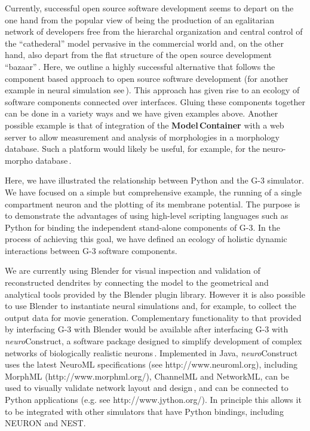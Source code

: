 \documentclass[12pt]{article}
\begin{document}
Currently, successful open source software development 
seems to depart on the one hand from the popular view of being the
production of an egalitarian network of developers free from the
hierarchal organization and central control of the ``cathederal''
model pervasive in the commercial world and, on the other hand, also
depart from the flat structure of the open source development
``bazaar''\,\cite{raymond01:_cathed_bazaar}\cite{Open-Source03theecology}.
Here, we outline a highly successful alternative that follows the
component based approach to open source software development (for
another example in neural simulation
see\,\cite{schuermann09:_neuron}). This approach has given rise to an
ecology of software components connected over interfaces.  Gluing
these components together can be done in a variety ways and we have
given examples above. Another possible example is that of integration
of the {\bf Model\,Container} with a web server to allow measurement
and analysis of morphologies in a morphology database.  Such a
platform would likely be useful, for example, for the neuro-morpho
database\,\cite{ascoli06:_mobil, ascoli07:_neurom}.

Here, we have illustrated the relationship between Python and the G-3
simulator.  We have focused on a simple but comprehensive example, the
running of a single compartment neuron and the plotting of its
membrane potential. The purpose is to demonstrate the advantages of
using high-level scripting languages such as Python for binding the
independent stand-alone components of G-3. In the process of achieving this goal, we have defined an ecology of holistic dynamic interactions between G-3 software components.


We are currently using Blender for visual inspection and validation of
reconstructed dendrites by connecting the model to the geometrical and
analytical tools provided by the Blender plugin library.  However it
is also possible to use Blender to instantiate neural simulations
and, for example, to collect the output data for movie generation.
Complementary functionality to that provided by interfacing G-3 with
Blender would be available after interfacing G-3 with {\it
  neuro}Construct, a software package designed to simplify development
of complex networks of biologically realistic
neurons\,\cite{gleeson05:_build_networ_model, gleeson07}.  Implemented in Java, {\it neuro}Construct uses the latest NeuroML specifications (see
http://www.neuroml.org), including MorphML (http://www.morphml.org/),
ChannelML and NetworkML, can be used to visually validate network
layout and design\,\cite{crook07:_morph}, and can be connected to Python applications (e.g.
see http://www.jython.org/). In principle this allows it to be integrated with other simulators that have
Python bindings, including NEURON and NEST.
\end{document}
